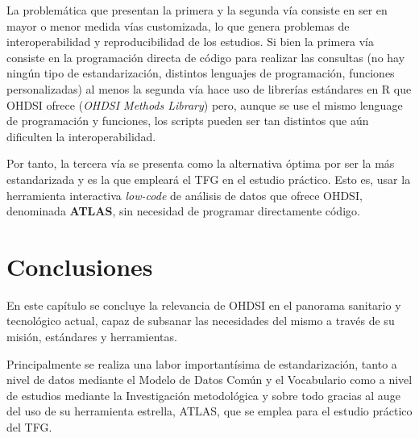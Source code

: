 La problemática que presentan la primera y la segunda vía consiste en ser en mayor o menor medida vías customizada, lo que genera problemas de interoperabilidad y reproducibilidad de los estudios. Si bien la primera vía consiste en la programación directa de código para realizar las consultas  (no hay ningún tipo de estandarización, distintos lenguajes de programación, funciones personalizadas) al menos la segunda vía hace uso de librerías estándares en R que OHDSI ofrece (\textit{OHDSI Methods Library}) pero, aunque se use el mismo lenguage de programación y funciones, los scripts pueden ser tan distintos que aún dificulten la interoperabilidad.

Por tanto, la tercera vía se presenta como la alternativa óptima por ser la más estandarizada y es la que empleará el TFG en el estudio práctico. Esto es, usar la herramienta interactiva \textit{low-code} de análisis de datos que ofrece OHDSI, denominada \textbf{ATLAS}, sin necesidad de programar directamente código.

\section{Conclusiones} \label{sec:05conclusion}

En este capítulo se concluye la relevancia de OHDSI en el panorama sanitario y tecnológico actual, capaz de subsanar las necesidades del mismo a través de su misión, estándares y herramientas.

Principalmente se realiza una labor importantísima de estandarización, tanto a nivel de datos mediante el Modelo de Datos Común y el Vocabulario como a nivel de estudios mediante la Investigación metodológica y sobre todo gracias al auge del uso de su herramienta estrella, ATLAS, que se emplea para el estudio práctico del TFG.